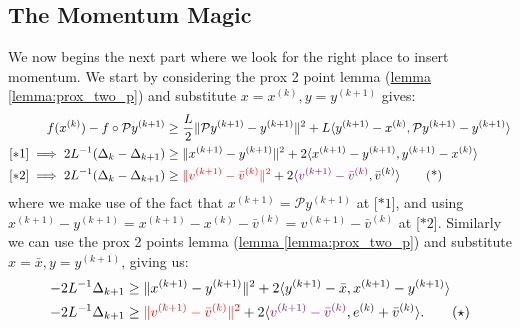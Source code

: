 \documentclass[]{article}
\theoremstyle{definition}
\begin{document}
    \subsection{The Momentum Magic}
        We now begins the next part where we look for the right place to insert momentum. We start by considering the prox 2 point lemma (\hyperref[lemma:prox_two_p]{lemma \ref*{lemma:prox_two_p}}) and substitute $x = x^{(k)}, y = y^{(k + 1)}$ gives: 
        \begin{align*}
            f(x^{(k)}) - f\circ \mathcal Py^{(k + 1)}
            &\ge 
            \frac{L}{2}\Vert \mathcal Py^{(k + 1)} - y^{(k + 1)}\Vert^2 + 
            L \langle y^{(k + 1)} - x^{(k)}, \mathcal P y^{(k + 1)} - y^{(k + 1)}\rangle 
            \\
            [*1]\implies
            2L^{-1} (\Delta_k - \Delta_{k + 1}) 
            &\ge 
            \Vert x^{(k + 1)} - y^{(k + 1)}\Vert^2 + 
            2 \langle x^{(k + 1)} - y^{(k + 1)}, y^{(k + 1)} - x^{(k)}\rangle
            \\
            [*2]\implies
            2L^{-1} (\Delta_k - \Delta_{k + 1})  
            & \ge 
            \textcolor{red}
            {
                \Vert 
                    v^{(k + 1)} - \bar v^{(k)}
                \Vert^2
            }
             + 
            2\langle \textcolor{violet}{v^{(k + 1)} - \bar v^{(k)}}, \bar v^{(k)}\rangle
            \tag{*}
        \end{align*}
        where we make use of the fact that $x^{(k + 1)} = \mathcal P y^{(k + 1)}$ at [$*1$], and using $x^{(k + 1)} - y^{(k + 1)} = x^{(k + 1)} - x^{(k)} - \bar v^{(k)} = v^{(k + 1)} - \bar v^{(k)}$ at [$*2$]. Similarly we can use the prox 2 points lemma (\hyperref[lemma:prox_two_p]{lemma \ref*{lemma:prox_two_p}}) and substitute $x = \bar x, y = y^{(k + 1)}$, giving us: 
        \begin{align*}
            -2L^{-1}\Delta_{k + 1} 
            &\ge 
            \Vert x^{(k + 1)} - y^{(k + 1)}\Vert^2 + 2
            \langle y^{(k + 1)} - \bar x, x^{(k + 1)} - y^{(k + 1)}\rangle
            \\
            -2L^{-1}\Delta_{k + 1} 
            & \ge 
            \textcolor{red}
            {
                \Vert 
                    v^{(k + 1)} - \bar v^{(k)}
                \Vert^2
            } + 
            2\langle  
                \textcolor{violet}{v^{(k + 1)} - \bar v^{(k)}},
                e^{(k)} + \bar v^{(k)}
            \rangle.
            \tag{$\star$}
        \end{align*}
\end{document}
